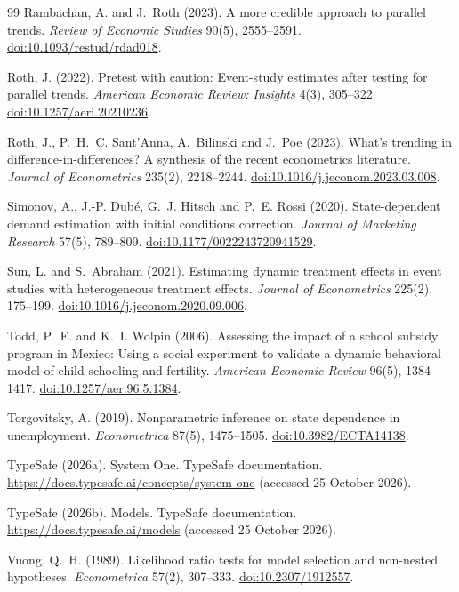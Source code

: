\documentclass[11pt]{article}
\begin{document}
\begin{thebibliography}{99}
Rambachan, A. and J.~Roth (2023).
A more credible approach to parallel trends.
\emph{Review of Economic Studies} 90(5), 2555--2591.
\href{https://doi.org/10.1093/restud/rdad018}{doi:10.1093/restud/rdad018}.

Roth, J. (2022).
Pretest with caution: Event-study estimates after testing for parallel trends.
\emph{American Economic Review: Insights} 4(3), 305--322.
\href{https://doi.org/10.1257/aeri.20210236}{doi:10.1257/aeri.20210236}.

Roth, J., P.~H.~C. Sant'Anna, A.~Bilinski and J.~Poe (2023).
What's trending in difference-in-differences? {A} synthesis of the recent econometrics literature.
\emph{Journal of Econometrics} 235(2), 2218--2244.
\href{https://doi.org/10.1016/j.jeconom.2023.03.008}{doi:10.1016/j.jeconom.2023.03.008}.

Simonov, A., J.-P. Dub{\'e}, G.~J. Hitsch and P.~E. Rossi (2020).
State-dependent demand estimation with initial conditions correction.
\emph{Journal of Marketing Research} 57(5), 789--809.
\href{https://doi.org/10.1177/0022243720941529}{doi:10.1177/0022243720941529}.

Sun, L. and S.~Abraham (2021).
Estimating dynamic treatment effects in event studies with heterogeneous treatment effects.
\emph{Journal of Econometrics} 225(2), 175--199.
\href{https://doi.org/10.1016/j.jeconom.2020.09.006}{doi:10.1016/j.jeconom.2020.09.006}.

Todd, P.~E. and K.~I. Wolpin (2006).
Assessing the impact of a school subsidy program in {M}exico: Using a social experiment to
validate a dynamic behavioral model of child schooling and fertility.
\emph{American Economic Review} 96(5), 1384--1417.
\href{https://doi.org/10.1257/aer.96.5.1384}{doi:10.1257/aer.96.5.1384}.

Torgovitsky, A. (2019).
Nonparametric inference on state dependence in unemployment.
\emph{Econometrica} 87(5), 1475--1505.
\href{https://doi.org/10.3982/ECTA14138}{doi:10.3982/ECTA14138}.

TypeSafe (2026a).
System One. TypeSafe documentation.
\url{https://docs.typesafe.ai/concepts/system-one} (accessed 25 October 2026).

TypeSafe (2026b).
Models. TypeSafe documentation.
\url{https://docs.typesafe.ai/models} (accessed 25 October 2026).

Vuong, Q.~H. (1989).
Likelihood ratio tests for model selection and non-nested hypotheses.
\emph{Econometrica} 57(2), 307--333.
\href{https://doi.org/10.2307/1912557}{doi:10.2307/1912557}.

\end{thebibliography}
\end{document}
